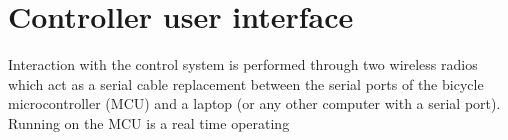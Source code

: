 \section{Controller user interface}
Interaction with the control system is performed through two wireless
radios~\cite{XBeePro} which act as a serial cable replacement between the serial
ports of the bicycle microcontroller (MCU) and a laptop (or any other computer
with a serial port). Running on the MCU is a real time operating
%
%
%
%
